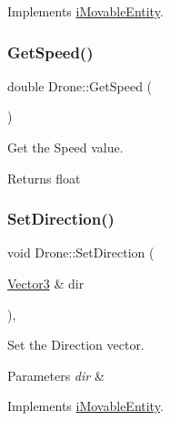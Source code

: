 Implements \hyperlink{classiMovableEntity_a8705402280a16c7eb6a271d1be34e678}{i\+Movable\+Entity}.

\mbox{\label{classDrone_ac8c535643f2be526c0ac8b0cc1fc49fc}} 
\subsubsection{\texorpdfstring{Get\+Speed()}{GetSpeed()}}
{\footnotesize\ttfamily double Drone\+::\+Get\+Speed (\begin{DoxyParamCaption}{ }\end{DoxyParamCaption})\hspace{0.3cm}{\ttfamily [inline]}}



Get the Speed value. 

\begin{DoxyReturn}{Returns}
float 
\end{DoxyReturn}
\mbox{\label{classDrone_a2ef1fbc3da17a8d599d2969990eb9614}} 
\subsubsection{\texorpdfstring{Set\+Direction()}{SetDirection()}}
{\footnotesize\ttfamily void Drone\+::\+Set\+Direction (\begin{DoxyParamCaption}\item[{\hyperlink{classVector3}{Vector3} \&}]{dir }\end{DoxyParamCaption})\hspace{0.3cm}{\ttfamily [inline]}, {\ttfamily [virtual]}}



Set the Direction vector. 


\begin{DoxyParams}{Parameters}
{\em dir} & \\
\hline
\end{DoxyParams}


Implements \hyperlink{classiMovableEntity_a631c4a8e24360bedecf1a675a18b10ef}{i\+Movable\+Entity}.

\mbox{\label{classDrone_a3987b919bf886857c139d2cde97d1d49}} 
